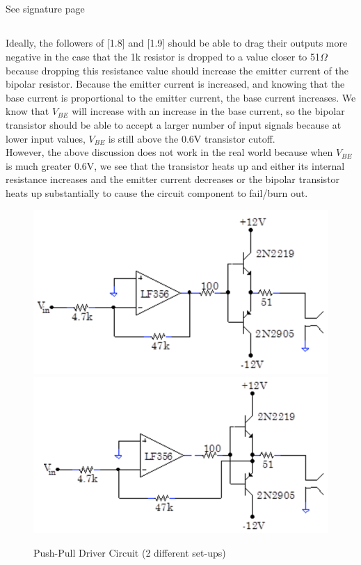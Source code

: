 \documentclass{article}
\begin{document}
\subsection{}
    See signature page

\subsection{}
    Ideally, the followers of [1.8] and [1.9] should be able to drag their outputs more negative in the case that the 1k resistor is dropped to a value closer to 51$\Omega$ because dropping this resistance value should increase the emitter current of the bipolar resistor. Because the emitter current is increased, and knowing that the base current is proportional to the emitter current, the base current increases. We know that $V_{BE}$ will increase with an increase in the base current, so the bipolar transistor should be able to accept a larger number of input signals because at lower input values, $V_{BE}$ is still above the 0.6V transistor cutoff.
    \\\indent However, the above discussion does not work in the real world because when $V_{BE}$ is much greater 0.6V, we see that the transistor heats up and either its internal resistance increases and the emitter current decreases or the bipolar transistor heats up substantially to cause the circuit component to fail/burn out.
    \begin{figure}[H]
        \centering
        \includegraphics[scale = 0.4]{18a.png}
        \includegraphics[scale = 0.4]{18b.png}
        \caption{Push-Pull Driver Circuit (2 different set-ups) \cite{lab8}}
        \label{fig:my_label}
    \end{figure}
\end{document}
